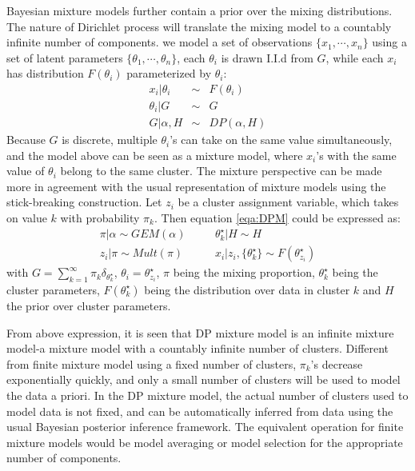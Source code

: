 Bayesian mixture models further contain a prior over the mixing distributions. The nature of Dirichlet process will translate the mixing model to a countably infinite number of components. we model a set of observations $\{x_1,\cdots,x_n\}$ using a set of latent parameters  $\{\theta_1,\cdots,\theta_n\}$, each $\theta_i$ is drawn I.I.d from $G$, while each $x_i$ has distribution $F(\theta_i)$ parameterized by $\theta_i$:
\begin{eqnarray}
	x_i|\theta_i&\sim& F(\theta_i)\nonumber\\
	\theta_i|G&\sim& G\\
	G|\alpha,H&\sim& DP(\alpha,H)\nonumber \label{eqa:DPM}
\end{eqnarray}
Because $G$ is discrete, multiple $\theta_i$'s can take on the same value simultaneously, and the model above can be seen as a mixture model, where $x_i$'s with the same value of $\theta_i$ belong to the same cluster. The mixture perspective can be made more in agreement with the usual representation of mixture models using the stick-breaking construction. Let $z_i$ be a cluster assignment variable, which takes on value $k$ with probability $\pi_k$. Then equation \ref{eqa:DPM} could be expressed as:
\begin{eqnarray}
	\pi|\alpha\sim GEM(\alpha)& \quad &\theta_k^\star|H\sim H \nonumber \\
	z_i|\pi\sim  Mult(\pi)& \quad & x_i|z_i,\{\theta_k^\star\} \sim F(\theta_{z_i}^\star)
\end{eqnarray}
with $G=\sum\nolimits_{k=1}^\infty\pi_k\delta_{\theta_k^\star}$,  $\theta_i=\theta_{z_i}^\star$, $\pi$ being the mixing proportion, $\theta_k^\star$ being the cluster parameters, $F(\theta_k^\star)$ being the distribution over data in cluster $k$ and $H$ the prior over cluster parameters.

From above expression, it is seen that DP mixture model is an infinite mixture model-a mixture model with a countably infinite number of clusters. Different from finite mixture model using a fixed number of clusters, $\pi_k$'s decrease exponentially quickly, and only a small number of clusters will be used to model the data a priori. In the DP mixture model, the actual number of clusters used to model data is not fixed, and can be automatically inferred from data using the usual Bayesian posterior inference framework. The equivalent operation for finite mixture models would be model averaging or model selection for the appropriate number of components.
\\

